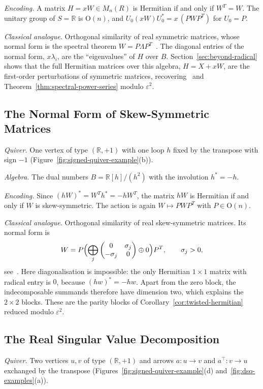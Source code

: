 \documentclass[12pt, a4paper]{report}
\theoremstyle{plain}
\theoremstyle{definition}
\theoremstyle{remark}
\theoremstyle{plain}
\newcommand{\RR}{\mathbb{R}}
\newcommand{\Or}{\mathrm{O}}
\begin{document}
\emph{Encoding.} A matrix $H=xW\in M_n(R)$ is Hermitian if and only if $W^T=W$. The unitary group of $S=\RR$ is $\Or(n)$, and $U_0(xW)U_0^*=x\,(PWP^T)$ for $U_0=P$.

\emph{Classical analogue.} Orthogonal similarity of real symmetric matrices, whose normal form is the spectral theorem $W=P\Lambda P^T$~\cite{HornJohnson2013}. The diagonal entries of the normal form, $x\lambda_i$, are the ``eigenvalues'' of $H$ over $B$. Section~\ref{sec:beyond-radical} shows that the full Hermitian matrices over this algebra, $H=X+xW$, are the first-order perturbations of symmetric matrices, recovering~\cite{Gutin2022DualNumbers} and Theorem~\ref{thm:spectral-power-series} modulo $\varepsilon^2$.

\subsection{The Normal Form of Skew-Symmetric Matrices}
\label{subsec:cat-skew}
\emph{Quiver.} One vertex of type $(\RR,+1)$ with one loop $h$ fixed by the transpose with sign $-1$ (Figure~\ref{fig:signed-quiver-example}(b)).

\emph{Algebra.} The dual numbers $B=\RR[h]/(h^2)$ with the involution $h^*=-h$.

\emph{Encoding.} Since $(hW)^*=W^Th^*=-hW^T$, the matrix $hW$ is Hermitian if and only if $W$ is skew-symmetric. The action is again $W\mapsto PWP^T$ with $P\in\Or(n)$.

\emph{Classical analogue.} Orthogonal similarity of real skew-symmetric matrices. Its normal form is
\[ W=P\Bigl(\bigoplus_j\begin{pmatrix}0&\sigma_j\\-\sigma_j&0\end{pmatrix}\oplus0\Bigr)P^T,\qquad\sigma_j>0, \]
see~\cite[Corollary~2.5.11]{HornJohnson2013}. Here diagonalisation is impossible: the only Hermitian $1\times1$ matrix with radical entry is $0$, because $(hw)^*=-hw$. Apart from the zero block, the indecomposable summands therefore have dimension two, which explains the $2\times2$ blocks. These are the parity blocks of Corollary~\ref{cor:twisted-hermitian} reduced modulo $\varepsilon^2$.

\subsection{The Real Singular Value Decomposition}
\label{subsec:cat-svd}
\emph{Quiver.} Two vertices $u,v$ of type $(\RR,+1)$ and arrows $a:u\to v$ and $a^{\top}:v\to u$ exchanged by the transpose (Figures~\ref{fig:signed-quiver-example}(d) and~\ref{fig:dsq-examples}(a)).
\end{document}
